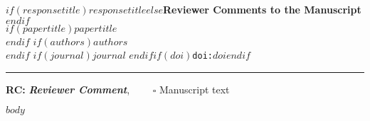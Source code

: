 \documentclass{article}
\begin{document}
{\Large\bf $if(responsetitle)$$responsetitle$$else$Reviewer Comments to the Manuscript$endif$}\\[1em]
$if(papertitle)${\huge $papertitle$}\\[1em]$endif$
$if(authors)${$authors$}\\$endif$
$if(journal)${\it $journal$ }$endif$$if(doi)$\texttt{doi:$doi$}$endif$\\
\hrule

\hfill {\bfseries RC:} \textbf{\textit{Reviewer Comment}},\(\quad\) \(\quad\square\) Manuscript text

$body$
\end{document}
